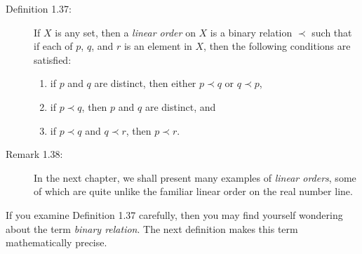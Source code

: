 \documentclass{book}
\begin{document}
\begin{description}

\item[Definition 1.37:] If $X$ is any set, then a \emph{linear order} on $X$ is a binary relation $\prec$ such that if each of $p$, $q$, and $r$ is an element in $X$, then the following conditions are satisfied:
\begin{enumerate}[\hspace{1cm}(a)]
  \item if $p$ and $q$ are distinct, then either $p \prec q$ or $q \prec p$,
  \item if $p \prec q$, then $p$ and $q$ are distinct, and
  \item if $p \prec q$ and $q \prec r$, then $p \prec r$.
\end{enumerate}

\item[Remark 1.38:] In the next chapter, we shall present many examples of \emph{linear orders}, some of which are quite unlike the familiar linear order on the real number line.

\end{description}

If you examine Definition 1.37 carefully, then you may find yourself wondering about the term \emph{binary relation}. The next definition makes this term mathematically precise.
\end{document}

